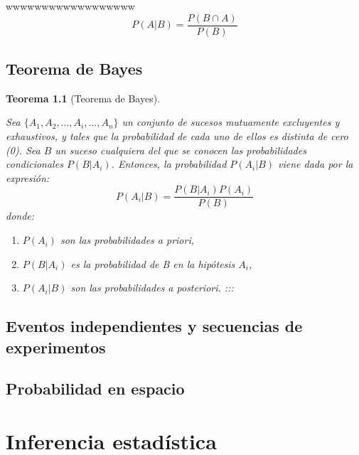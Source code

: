 \documentclass[
  11pt,
]{krantz}
\providecommand{\tightlist}{%
  \setlength{\itemsep}{0pt}\setlength{\parskip}{0pt}}
\newtheorem{theorem}{Teorema}[chapter]
\theoremstyle{definition}
\theoremstyle{definition}
\theoremstyle{definition}
\theoremstyle{definition}
\theoremstyle{remark}
\begin{document}
\leavevmode\hypertarget{wwwwwwww}{}%
wwwwwwwwwwwwwwwwww\[P(A|B)= \frac{P(B\cap A)}{P(B)}\]

\hypertarget{teorema-de-bayes}{%
\chapter{Teorema de Bayes}\label{teorema-de-bayes}}

\begin{theorem}[Teorema de Bayes]
\protect\hypertarget{thm:wwwwwwwwwwwwwwwwwwwwwwwwww}{}\label{thm:wwwwwwwwwwwwwwwwwwwwwwwwww}

Sea \(\{A_{1},A_{2},...,A_{i},...,A_{n}\}\) un conjunto de sucesos mutuamente excluyentes y exhaustivos, y tales que la probabilidad de cada uno de ellos es distinta de cero (0). Sea \(B\) un suceso cualquiera del que se conocen las probabilidades condicionales \(P(B|A_i )\). Entonces, la probabilidad \(P(A_i|B)\) viene dada por la expresión: \[P(A_i|B)=\frac{P(B|A_i)P(A_i)}{P(B)}\] donde:

\begin{enumerate}
\def\labelenumi{\arabic{enumi}.}
\tightlist
\item
  \(P(A_i)\) son las probabilidades a priori,
\item
  \(P(B|A_i)\) es la probabilidad de B en la hipótesis \(A_i\),
\item
  \(P(A_i|B)\) son las probabilidades a posteriori. :::
\end{enumerate}

\end{theorem}

\hypertarget{eventos-independientes-y-secuencias-de-experimentos}{%
\chapter{Eventos independientes y secuencias de experimentos}\label{eventos-independientes-y-secuencias-de-experimentos}}

\hypertarget{probabilidad-en-espacio}{%
\chapter{Probabilidad en espacio}\label{probabilidad-en-espacio}}

\hypertarget{part-inferencia-estaduxedstica}{%
\part{Inferencia estadística}\label{part-inferencia-estaduxedstica}}
\end{document}
